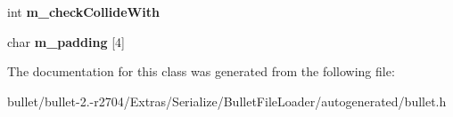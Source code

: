 \begin{DoxyCompactItemize}
\item 
\hypertarget{class_bullet_1_1bt_collision_object_float_data_a8d62af05d62702674e4c419c0589fc3b}{int {\bfseries m\+\_\+check\+Collide\+With}}\label{class_bullet_1_1bt_collision_object_float_data_a8d62af05d62702674e4c419c0589fc3b}

\item 
\hypertarget{class_bullet_1_1bt_collision_object_float_data_ae8bd12effd876a0240c0bf3db89e6e3b}{char {\bfseries m\+\_\+padding} \mbox{[}4\mbox{]}}\label{class_bullet_1_1bt_collision_object_float_data_ae8bd12effd876a0240c0bf3db89e6e3b}

\end{DoxyCompactItemize}


The documentation for this class was generated from the following file\+:\begin{DoxyCompactItemize}
\item 
bullet/bullet-\/2.-\/r2704/\+Extras/\+Serialize/\+Bullet\+File\+Loader/autogenerated/bullet.\+h\end{DoxyCompactItemize}
